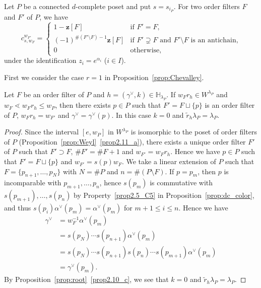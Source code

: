 \documentclass[ALCO,ThmDefs,Unicode,epreuves]{cedram}
\newcommand\vectz{\boldsymbol{z}}
\renewcommand\tilde{\widetilde}
\begin{document}
\begin{prop}
\label{prop:Chevalley_P}
Let $P$ be a connected $d$-complete poset and put $s = s_{i_P}$.
For two order filters $F$ and $F'$ of $P$, we have
\begin{equation}
\label{eq:Chevalley_P}
c^{w_{F'}}_{s,w_F}
 =
\begin{cases}
 1 - \vectz[F]
 &\text{if $F' = F$,}
\\
 (-1)^{\# (F' \setminus F) -1} \vectz[F]
 &\text{if $F' \supsetneq F$ and $F' \setminus F$ is an antichain,}
\\
 0
 &\text{otherwise,}
\end{cases}
\end{equation}
under the identification $z_i = e^{\alpha_i}$ \textup{(}$i \in I$\textup{)}.
\end{prop}

First we consider the case $r=1$ in Proposition~\ref{prop:Chevalley}.

\begin{lemm}
\label{lem:r=1}
Let $F$ be an order filter of $P$ and $h = (\gamma^\vee,k) \in \mathbb{H}_{\lambda_P}$.
If $w_F r_h \in W^{\lambda_P}$ and $w_F \lessdot w_F r_h \le w_P$, 
then there exists $p \in P$ such that $F' = F \sqcup \{ p \}$ is an order filter of $P$, 
$w_F r_h = w_{F'}$ and $\gamma^\vee = \gamma^\vee(p)$.
In this case $k=0$ and $\tilde{r}_h \lambda_P = \lambda_P$.
\end{lemm}

\begin{proof}
Since the interval $[e, w_P]$ in $W^{\lambda_P}$ is isomorphic to the poset of order filters of $P$ 
(Proposition~\ref{prop:Weyl}~\ref{prop2.11_a}), 
there exists a unique order filter $F'$ of $P$ such that $F' \supset F$, 
$\# F' = \# F + 1$ and $w_{F'} = w_F r_h$.
Hence we have $p \in P$ such that $F' = F \sqcup \{ p \}$ and $w_{F'} = s(p) w_F$.
We take a linear extension of $P$ such that $F = \{ p_{n+1}, \ldots, p_N \}$ 
with $N = \# P$ and $n = \# (P \setminus F)$.
If $p = p_m$, then $p$ is incomparable with $p_{m+1}, \ldots, p_n$, 
hence $s(p_m)$ is commutative with $s(p_{m+1}), \ldots, s(p_n)$ by Property~\ref{prop2.5_C5}
in Proposition~\ref{prop:dc_color}, 
and thus $s(p_i)\alpha^\vee(p_m)=\alpha^\vee(p_m)$ for $m+1 \le i \le n$.
Hence we have
\begin{align*}
\gamma^\vee
 &= 
w_F^{-1} \alpha^\vee(p_m)
\\
 &=
s(p_N) \cdots s(p_{n+1}) \alpha^\vee(p_m)
\\
 &=
s(p_N) \cdots s(p_{n+1}) s(p_n) \cdots s(p_{m+1}) \alpha^\vee(p_m)
\\
 &=
\gamma^\vee(p_m).
\end{align*}
By Proposition~\ref{prop:root}~\ref{prop2.10_c}, we see that $k=0$ and $\tilde{r}_h \lambda_P = \lambda_P$.
\end{proof}
\end{document}
